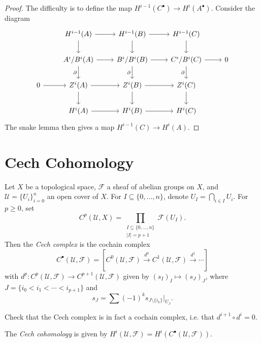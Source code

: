 \begin{proof}
  The difficulty is to define
  the map $H^{i - 1}(C^\bullet) \to H^i(A^\bullet)$.
  Consider the diagram
  \[
    \begin{tikzcd}
      & H^{i - 1}(A) \ar[r] \ar[d] & H^{i - 1}(B) \ar[r] \ar[d] & H^{i - 1}(C) \ar[d] \\
      & A^i / B^i(A) \ar[r] \ar[d, swap, "\partial"] & B^i / B^i(B) \ar[r] \ar[d, swap, "\partial"] & C^i / B^i(C) \ar[r] \ar[d, swap, "\partial"] & 0 \\
      0 \ar[r] & Z^i(A) \ar[r] \ar[d] & Z^i(B)
      \ar[r] \ar[d] & Z^i(C) \ar[d] \\
             & H^i(A) \ar[r] & H^i(B) \ar[r] & H^i(C)
    \end{tikzcd}
  \]
  The snake lemma then gives a map
  $H^{i - 1}(C) \to H^i(A)$.
\end{proof}

\section{Cech Cohomology}

\begin{definition}
  Let $X$ be a topological space,
  $\mathcal{F}$ a sheaf of abelian groups
  on $X$, and $\mathcal{U} = \{U_i\}_{i = 0}^n$
  an open cover of $X$.
  For $I \subseteq \{0, \dots, n\}$, denote
  $U_I = \bigcap_{i \in I} U_i$. For
  $p \ge 0$, set
  \[
    C^p(\mathcal{U}, X)
    = \prod_{\substack{I \subseteq \{0, \dots, n\} \\ |I| = p + 1}}
    \mathcal{F}(U_I).
  \]
  Then the \emph{Cech complex} is the
  cochain complex
  \[
    C^\bullet(\mathcal{U}, \mathcal{F})
    = [
    C^0(\mathcal{U}, \mathcal{F}) \overset{d^0}{\longrightarrow} C^1(\mathcal{U}, \mathcal{F}) \overset{d^1}{\longrightarrow} \cdots
    ]
  \]
  with $d^p : C^p(\mathcal{U}, \mathcal{F}) \to C^{p + 1}(\mathcal{U}, \mathcal{F})$ given by
  $(s_I)_I \mapsto (s_J)_J$, where
  $J = \{i_0 < i_1 < \cdots < i_{p + 1}\}$
  and
  \[
    s_J = \sum (-1)^k s_{J \setminus \{i_k\}}|_{U_J}.
  \]
\end{definition}

\begin{exercise}
  Check that the Cech complex is in
  fact a cochain complex, i.e. that
  $d^{i + 1} \circ d^i = 0$.
\end{exercise}

\begin{definition}
  The \emph{Cech cohomology} is
  given by $H^i(\mathcal{U}, \mathcal{F}) = H^i(C^\bullet(\mathcal{U}, \mathcal{F}))$.
\end{definition}

